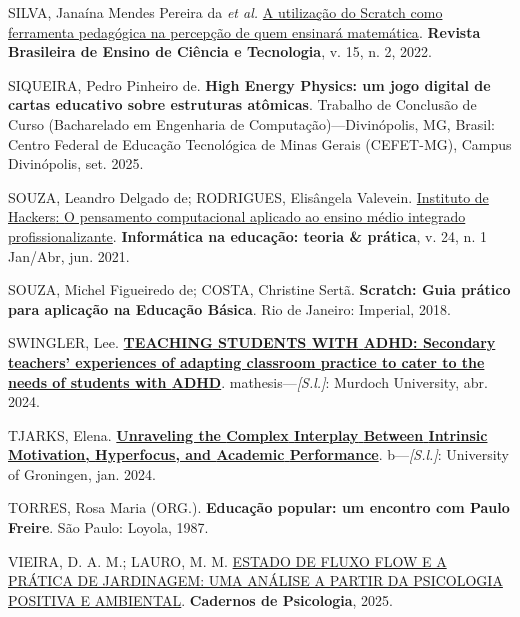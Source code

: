 \documentclass[
  12pt,
  a4paper,
]{article}
\newlength{\cslhangindent}
\newenvironment{CSLReferences}[2] %
 {\begin{list}{}{%
  \setlength{\itemindent}{0pt}
  \setlength{\leftmargin}{0pt}
  \setlength{\parsep}{0pt}
  \ifodd #1
   \setlength{\leftmargin}{\cslhangindent}
   \setlength{\itemindent}{-1\cslhangindent}
  \fi
  \setlength{\itemsep}{#2\baselineskip}}}
 {\end{list}}
\begin{document}
\begin{CSLReferences}{0}{1}
SILVA, Janaína Mendes Pereira da \emph{et al.}
\href{https://doi.org/10.3895/rbect.v15n2.9614}{A utilização do
{Scratch} como ferramenta pedagógica na percepção de quem ensinará
matemática}. \textbf{Revista Brasileira de Ensino de Ciência e
Tecnologia}, v. 15, n. 2, 2022.

SIQUEIRA, Pedro Pinheiro de. \textbf{High {Energy} {Physics}: um jogo
digital de cartas educativo sobre estruturas atômicas}. Trabalho de
Conclusão de Curso (Bacharelado em Engenharia de
Computação)---Divinópolis, MG, Brasil: Centro Federal de Educação
Tecnológica de Minas Gerais (CEFET-MG), Campus Divinópolis, set. 2025.

SOUZA, Leandro Delgado de; RODRIGUES, Elisângela Valevein.
\href{https://doi.org/10.22456/1982-1654.109902}{Instituto de {Hackers}:
{O} pensamento computacional aplicado ao ensino médio integrado
profissionalizante}. \textbf{Informática na educação: teoria \&
prática}, v. 24, n. 1 Jan/Abr, jun. 2021.

SOUZA, Michel Figueiredo de; COSTA, Christine Sertã. \textbf{Scratch:
Guia pr{á}tico para aplica{ç}{ã}o na Educa{ç}{ã}o B{á}sica}. Rio de
Janeiro: Imperial, 2018.

SWINGLER, Lee.
\textbf{\href{https://researchportal.murdoch.edu.au/esploro/outputs/graduate/TEACHING-STUDENTS-WITH-ADHD-Secondary-teachers/991005714570107891}{{TEACHING}
{STUDENTS} {WITH} {ADHD}: {Secondary} teachers' experiences of adapting
classroom practice to cater to the needs of students with {ADHD}}}.
mathesis---\emph{{[}S.l.{]}}: Murdoch University, abr. 2024.

TJARKS, Elena.
\textbf{\href{https://gmwpublic.studenttheses.ub.rug.nl/3037/}{Unraveling
the {Complex} {Interplay} {Between} {Intrinsic} {Motivation},
{Hyperfocus}, and {Academic} {Performance}}}. b---\emph{{[}S.l.{]}}:
University of Groningen, jan. 2024.

TORRES, Rosa Maria (ORG.). \textbf{Educação popular: um encontro com
Paulo Freire}. São Paulo: Loyola, 1987.

VIEIRA, D. A. M.; LAURO, M. M.
\href{http://seer.uniacademia.edu.br/index.php/cadernospsicologia/article/view/4501}{ESTADO
DE FLUXO FLOW E A PRÁTICA DE JARDINAGEM: UMA ANÁLISE A PARTIR DA
PSICOLOGIA POSITIVA E AMBIENTAL}. \textbf{Cadernos de Psicologia}, 2025.

\end{CSLReferences}
\end{document}
